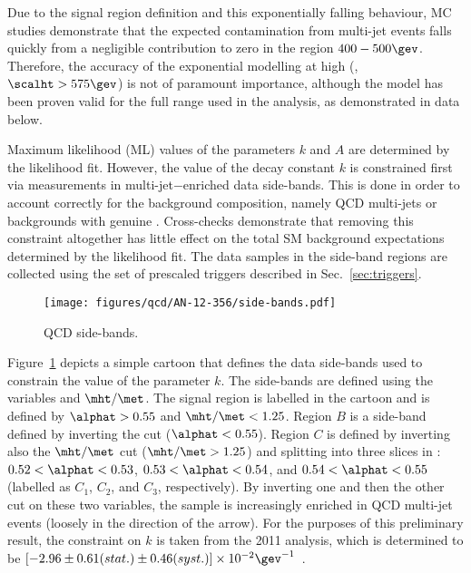 Due to the signal region definition and this exponentially falling
behaviour, MC studies demonstrate that the expected contamination from
multi-jet events falls quickly from a negligible contribution to zero
in the region $400-500\gev$. Therefore, the accuracy of the
exponential modelling at high \scalht (\ie, $\scalht > 575\gev$) is
not of paramount importance, although the model has been proven valid
for the full \scalht range used in the analysis, as demonstrated in
data below.

Maximum likelihood (ML) values of the parameters $k$ and $A$ are
determined by the likelihood fit. However, the value of the decay
constant $k$ is constrained first via measurements in
multi-jet$-$enriched data side-bands. This is done in order to account
correctly for the background composition, namely QCD multi-jets or
backgrounds with genuine \met. Cross-checks demonstrate that removing
this constraint altogether has little effect on the total SM
background expectations determined by the likelihood fit. The data
samples in the side-band regions are collected using the set of
prescaled \httrigger triggers described in Sec.~\ref{sec:triggers}.

\begin{figure}[!h]
  \begin{center}
    \texttt{[image: figures/qcd/AN-12-356/side-bands.pdf]}
    \caption{QCD side-bands.}
    \label{fig:side-bands}
  \end{center}
\end{figure}

Figure~\ref{fig:side-bands} depicts a simple cartoon that defines the
data side-bands used to constrain the value of the parameter $k$. The
side-bands are defined using the variables \alphat and
$\mht/\met$. The signal region is labelled in the cartoon and is
defined by $\alphat > 0.55$ and $\mht/\met < 1.25$. Region $B$ is a
side-band defined by inverting the \alphat cut (\ie $\alphat <
0.55$). Region $C$ is defined by inverting also the $\mht/\met$ cut
(\ie $\mht/\met > 1.25$) and splitting into three slices in \alphat:
$0.52 < \alphat < 0.53$, $0.53 < \alphat < 0.54$, and $0.54 < \alphat
< 0.55$ (labelled as $C_1$, $C_2$, and $C_3$, respectively). By
inverting one and then the other cut on these two variables, the
sample is increasingly enriched in QCD multi-jet events (loosely in
the direction of the arrow). For the purposes of this preliminary
result, the constraint on $k$ is taken from the 2011 analysis, which
is determined to be $[ -2.96 \pm 0.61 (stat.) \pm 0.46 (syst.)  ]
\times 10^{-2}\gev^{-1}$~\cite{RA1PAS2011}.

